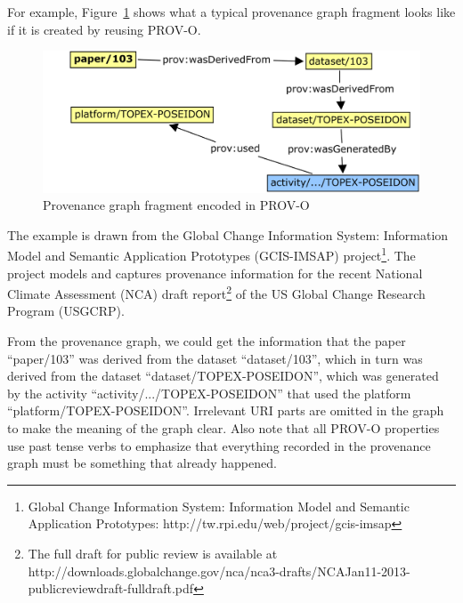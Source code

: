 For example, Figure~\ref{fig:gcis} shows what a typical provenance graph fragment looks like if it is created by reusing PROV-O.
\begin{figure}
	\includegraphics[width=\textwidth]{gcis-prov.png}
	\caption{Provenance graph fragment encoded in PROV-O }
	\label{fig:gcis}
\end{figure}
The example is drawn from the Global Change Information System: Information Model and Semantic Application Prototypes (GCIS-IMSAP) project\footnote{Global Change Information System: Information Model and Semantic Application Prototypes: http://tw.rpi.edu/web/project/gcis-imsap}. The project models and captures provenance information for the recent National Climate Assessment (NCA) draft report\footnote{The full draft for public review is available at http://downloads.globalchange.gov/nca/nca3-drafts/NCAJan11-2013-publicreviewdraft-fulldraft.pdf} of the US Global Change Research Program (USGCRP).

From the provenance graph, we could get the information that the paper ``paper/103'' was derived from the dataset ``dataset/103'', which in turn was derived from the dataset ``dataset/TOPEX-POSEIDON'', which was generated by the activity ``activity/.../TOPEX-POSEIDON'' that used the platform ``platform/TOPEX-POSEIDON''. Irrelevant URI parts are omitted in the graph to make the meaning of the graph clear. Also note that all PROV-O properties use past tense verbs to emphasize that everything recorded in the provenance graph must be something that already happened.

